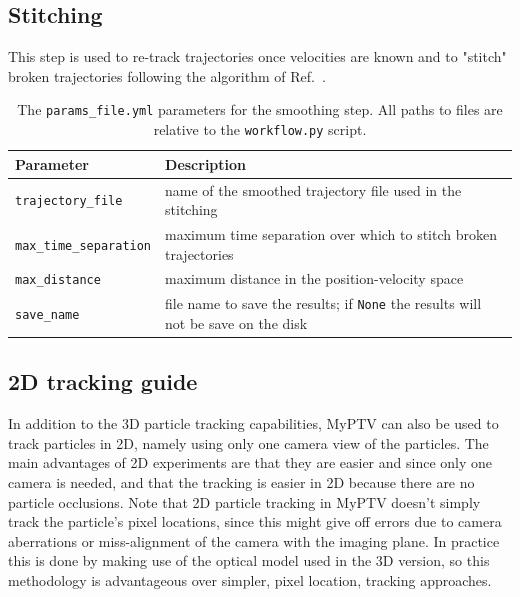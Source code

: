\documentclass[10pt,a4paper]{article}
\begin{document}
\subsection{Stitching}\label{sec:workflow_stitch}

This step is used to re-track trajectories once velocities are known and to "stitch" broken trajectories following the algorithm of Ref.~\cite{Xu2008}.


\begin{table}[!ht]
	\centering
	\caption{The \texttt{params\_file.yml} parameters for the smoothing step. All paths to files are relative to the \texttt{workflow.py} script.}
	\begin{tabular}{l m{10cm}}
		\hline
		Parameter & Description\\
		\hline
		
		\texttt{trajectory\_file} & name of the smoothed trajectory file used in the stitching \\
		
		\texttt{max\_time\_separation} & maximum time separation over which to stitch broken trajectories \\
		
		\texttt{max\_distance} & maximum distance in the position-velocity space \\
		
		\texttt{save\_name} & file name to save the results; if \texttt{None} the results will not be save on the disk \\
		
		\hline
	\end{tabular}
\end{table}










\subsection{2D tracking guide} \label{sec:2D_tracking}


In addition to the 3D particle tracking capabilities, MyPTV can also be used to track particles in 2D, namely using only one camera view of the particles. The main advantages of 2D experiments are that they are easier and since only one camera is needed, and that the tracking is easier in 2D because there are no particle occlusions. Note that 2D particle tracking in MyPTV doesn't simply track the particle's pixel locations, since this might give off errors due to camera aberrations or miss-alignment of the camera with the imaging plane. In practice this is done by making use of the optical model used in the 3D version, so this methodology is advantageous over simpler, pixel location, tracking approaches. 
\end{document}
